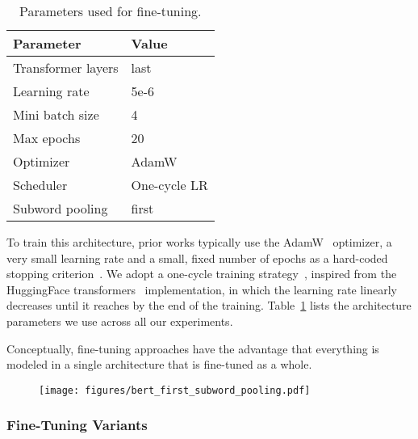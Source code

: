 \documentclass[11pt,a4paper]{article}
\begin{document}
\begin{table}[h]
\begin{center}
\begin{tabular}{ l l }
\toprule
Parameter & Value \\
\midrule
Transformer layers & last \\
Learning rate & 5e-6 \\
Mini batch size & 4 \\
Max epochs & 20 \\
Optimizer & AdamW \\ Scheduler & One-cycle LR \\
Subword pooling & first \\
\bottomrule
\end{tabular}
\end{center}
\vspace{-2mm}
\caption{\label{tab:finetuning_params} Parameters used for fine-tuning.}
\end{table}

To train this architecture, prior works typically use the AdamW~\cite{loshchilov2018decoupled} optimizer, a very small learning rate and a small, fixed number of epochs as a hard-coded stopping criterion~\cite{conneau2019unsupervised}. We adopt a one-cycle training strategy~\cite{2018arXiv180309820S}, inspired from the HuggingFace transformers~\cite{wolf2019huggingface} implementation, in which the learning rate linearly decreases until it reaches  by the end of the training. Table~\ref{tab:finetuning_params} lists the architecture parameters we use across all our experiments. 

Conceptually, fine-tuning approaches have the advantage that everything is modeled in a single architecture that is fine-tuned as a whole. 

\begin{figure}[t!]
 \centering
 \texttt{[image: figures/bert\_first\_subword\_pooling.pdf]}
 \label{fig:subword_pooling}
\end{figure}

\subsubsection{Fine-Tuning Variants}
\label{sec:baseline_setup}
\end{document}
